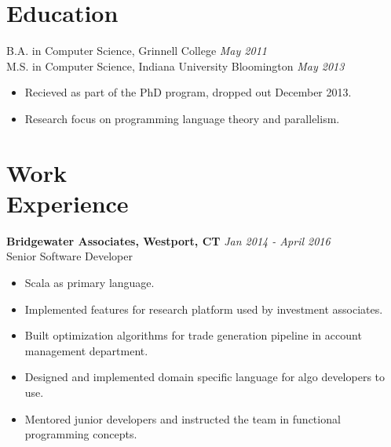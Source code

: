 \documentclass[margin]{res}
\begin{document}
 
 

\address{{\bf Contact} \\ jobs@aarontodd.name \\ (415) 847-0997 }

\address{{\bf Address} \\ 8 Haviland St. Apt B \\ Norwalk, CT 06854 }


\begin{resume} 
 
\section{Education}
B.A. in Computer Science, Grinnell College \hfill \textit{May 2011} \\
M.S. in Computer Science, Indiana University Bloomington \hfill \textit{May 2013}
\begin{itemize} \itemsep -2pt
\item Recieved as part of the PhD program, dropped out December 2013.
\item Research focus on programming language theory and parallelism.
\end{itemize}  
 

\section{Work \\ Experience}

 {\bf Bridgewater Associates, Westport, CT} \hfill \textit{Jan 2014 - April 2016} \\
 Senior Software Developer
 \begin{itemize} \itemsep -2pt  %
 \item Scala as primary language.
 \item Implemented features for research platform used by investment associates.
 \item Built optimization algorithms for trade generation pipeline in account management department.
 \item Designed and implemented domain specific language for algo developers to use.
 \item Mentored junior developers and instructed the team in functional programming concepts.
 \end{itemize}


\end{resume}
\end{document}

